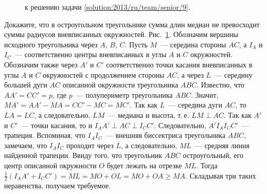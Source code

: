 \ifsolution
\begin{figure}[bt]\centering
    \caption{к решению задачи \ref{solution:2013/ru/team/senior/9}.}
    \label{fig:solution:2013/ru/team/senior/9}
\end{figure}
\fi %

\problem{}
Докажите, что в остроугольном треугольнике сумма длин медиан не превосходит
суммы радиусов вневписанных окружностей.
\solution
\label{solution:2013/ru/team/senior/9}
Рис.~\ref{fig:solution:2013/ru/team/senior/9}.
Обозначим вершины исходного треугольника через $A$, $B$, $C$.
Пусть $M$~--- середина стороны $AC$, а $I_A$ и $I_C$~--- соответственно центры
вневписанных в углы $A$ и $C$ окружностей.
Обозначим также через $A'$ и $C'$ соответственно точки касания вневписанных в
углы $A$ и $C$ окружностей с продолжением стороны $AC$, а через $L$~---
середину большей дуги $AC$ описанной окружности треугольника $ABC$.
Известно, что $AA' = CC' = p$, где $p$~--- полупериметр треугольника $ABC$.
Значит, $MA' = AA' - MA = CC' - MC = MC'$.
Так как $L$~--- середина дуги $AC$, то $LA = LC$, а следовательно, $LM$~---
медиана и высота, т.\,е. $LM \perp AC$.
Так как $A'$ и $C'$~--- точки касания, то и $I_A A' \perp AC \perp I_C C'$.
Следовательно, $A' I_A I_C C'$~--- трапеция.
Вспоминая, что $I_A I_C$~--- внешняя биссектриса треугольника $ABC$, замечаем,
что $I_A I_C$ проходит через $L$, а следовательно, $ML$~--- средняя линия
найденной трапеции.
Ввиду того, что треугольник $ABC$ остроугольный, его центр описанной окружности
$O$ будет лежать на отрезке $ML$.
Тогда $\frac{1}{2} (I_A A' + I_C C') = ML = MO + OL = MO + OA \geq MA$.
Складывая три таких неравенства, получаем требуемое.
\endproblem
